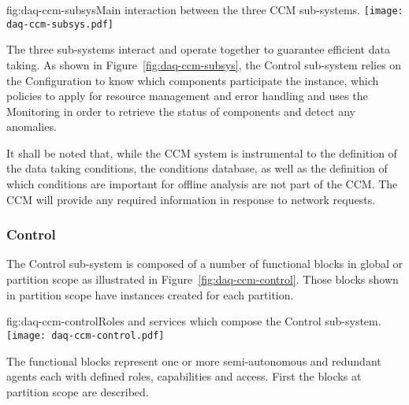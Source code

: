 \begin{dunefigure}{fig:daq-ccm-subsys}{Main interaction between the three CCM sub-systems.}
  \texttt{[image: daq-ccm-subsys.pdf]}
\end{dunefigure}

The three  sub-systems interact and operate together to guarantee efficient data taking.  As shown in Figure~\ref{fig:daq-ccm-subsys}, the Control sub-system relies on the Configuration to know which components participate the  instance, which policies to apply for resource management and error handling and uses the Monitoring in order to retrieve the status of  components and detect any anomalies.

It shall be noted that, while the CCM system is instrumental to the definition of the data taking conditions, the conditions database, as well as the definition of which conditions are important for offline analysis are not part of the CCM. The CCM will provide any required information in response to network requests.

\subsubsection{Control}
\label{sec:daq:design:ccm:control}

The  Control sub-system is composed of a number of functional blocks in global or partition scope as illustrated in Figure~\ref{fig:daq-ccm-control}. 
Those blocks shown in partition scope have instances created for each partition. 


\begin{dunefigure}{fig:daq-ccm-control}{Roles and services which compose the  Control sub-system.}
  \texttt{[image: daq-ccm-control.pdf]}
\end{dunefigure}

The functional blocks represent one or more semi-autonomous and redundant agents each with defined roles, capabilities and access.  First the blocks at partition scope are described.

